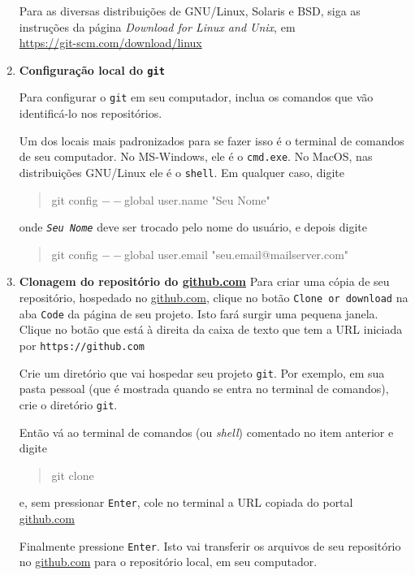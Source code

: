 \documentclass[10pt,a4paper]{article}
\begin{document}
\begin{enumerate}
		Para as diversas distribuições de GNU/Linux, Solaris e BSD, siga as instruções da página {\em Download for Linux and Unix}, em \\
        \url{https://git-scm.com/download/linux}

                
        \item {\bf Configuração local do {\tt git}}
        
		Para configurar o {\tt git} em seu computador, inclua os comandos que vão identificá-lo nos repositórios. 
		
		Um dos locais mais padronizados para se fazer isso é o terminal de comandos de seu computador. No MS-Windows, ele é o {\tt cmd.exe}.  No MacOS, nas distribuições GNU/Linux ele é o {\tt shell}. Em qualquer caso, digite 
		\begin{quote}
		\begin{tt}		
			git config $--$global user.name "Seu Nome"
		\end{tt}			
		\end{quote} 
		onde {\tt {\em Seu Nome}} deve ser trocado pelo nome do usuário, e depois digite
		\begin{quote}
		\begin{tt}		
			git config $--$global user.email "seu.email@mailserver.com"
		\end{tt}			
		\end{quote} 
	
	\item {\bf Clonagem do repositório do \url{github.com}}
    	Para criar uma cópia de seu repositório, hospedado no \url{github.com}, clique no botão {\tt Clone or download} na aba {\tt Code} da página de seu projeto. Isto fará surgir uma pequena janela. Clique no botão que está à direita da caixa de texto que tem a URL iniciada por {\tt https://github.com}
    	
    	Crie um diretório que vai hospedar seu projeto {\tt git}. Por exemplo, em sua pasta pessoal (que é mostrada quando se entra no terminal de comandos), crie o diretório {\tt git}. 
    	
    	Então vá ao terminal de comandos (ou {\em shell}) comentado no item anterior e digite 
	\begin{quote}
	\begin{tt}
	    git clone
	\end{tt}
	\end{quote}
	e, sem pressionar {\tt Enter}, cole no terminal a URL copiada do portal \url{github.com}
		
	Finalmente pressione {\tt Enter}. Isto vai transferir os arquivos de seu repositório 
	no \url{github.com} para o repositório local, em seu computador.
		

\end{enumerate}
\end{document}
